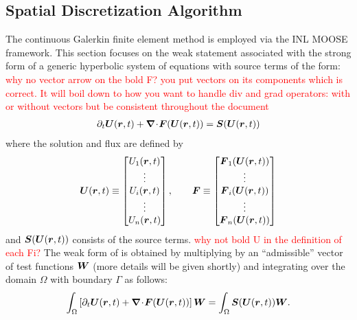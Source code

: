 \subsection{Spatial Discretization Algorithm\label{sec:spatial_discretization}}
%
The continuous Galerkin finite element method is employed
via the INL MOOSE framework.  This section focuses on
the weak statement associated with the strong form of a generic hyperbolic system of equations with source terms of the form:
\textcolor{red}{why no vector arrow on the bold F? you put vectors on its components which is correct. It will boil down to how you want to handle div and grad operators: with or without vectors but be consistent throughout the document}
\begin{align}\label{eqn:va_system_notation}
\partial_t \boldsymbol U(\boldsymbol r, t) + \boldsymbol{\nabla}\! \cdot \! \boldsymbol F(\boldsymbol U(\boldsymbol r, t)) = \boldsymbol S(\boldsymbol U(\boldsymbol r, t))
\end{align}
where the solution and flux are defined by
\begin{align}
  \boldsymbol U(\boldsymbol r, t) \equiv
  \begin{bmatrix}
    U_1(\boldsymbol r, t)
    \\
    \vdots
    \\
    U_i(\boldsymbol r, t)
    \\
   \vdots
    \\
   U_n(\boldsymbol r, t)
  \end{bmatrix},
  \qquad
  \boldsymbol F \equiv
  \begin{bmatrix}
    \boldsymbol F_1(\boldsymbol U(\boldsymbol r, t))
    \\
    \vdots
    \\
    \boldsymbol F_i(\boldsymbol U(\boldsymbol r, t))
    \\
    \vdots
    \\
    \boldsymbol F_n(\boldsymbol U(\boldsymbol r, t))
  \end{bmatrix}
\end{align}
and $  \boldsymbol S(\boldsymbol U(\boldsymbol r, t))$ consists of the source
terms. \textcolor{red}{why not bold U in the definition of each Fi?}
%
The weak form of  is obtained by multiplying
by an ``admissible'' vector of test functions 
$\boldsymbol W$ (more details will be given shortly) and
integrating over the domain $\Omega$ with boundary $\Gamma$ as follows:
\begin{align}
  \label{en:va_system_weak}
  \int_{\Omega} \left[ \partial_t \boldsymbol U(\boldsymbol r, t) + \boldsymbol{\nabla}\! \cdot \! \boldsymbol F(\boldsymbol U(\boldsymbol r, t))\right]  \boldsymbol W 
  =  \int_{\Omega}  \boldsymbol S(\boldsymbol U(\boldsymbol r, t))  \boldsymbol W.
\end{align}
